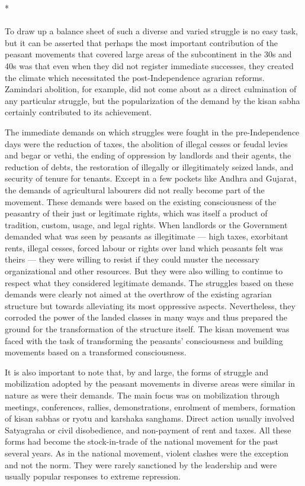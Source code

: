 \begin{center}*\end{center}

\paragraph*{}


To draw up a balance sheet of such a diverse and varied struggle is no easy task, but it can be asserted that perhaps the most important contribution of the peasant movements that covered large areas of the subcontinent in the 30s and 40s was that even when they did not register immediate successes, they created the climate which necessitated the post-Independence agrarian reforms. Zamindari abolition, for example, did not come about as a direct culmination of any particular struggle, but the popularization of the demand by the kisan sabha certainly contributed to its achievement.

The immediate demands on which struggles were fought in the pre-Independence days were the reduction of taxes, the abolition of illegal cesses or feudal levies and begar or vethi, the ending of oppression by landlords and their agents, the reduction of debts, the restoration of illegally or illegitimately seized lands, and security of tenure for tenants. Except in a few pockets like Andhra and Gujarat, the demands of agricultural labourers did not really become part of the movement. These demands were based on the existing consciousness of the peasantry of their just or legitimate rights, which was itself a product of tradition, custom, usage, and legal rights. When landlords or the Government demanded what was seen by peasants as illegitimate — high taxes, exorbitant rents, illegal cesses, forced labour or rights over land which peasants felt was theirs — they were willing to resist if they could muster the necessary organizational and other resources. But they were also willing to continue to respect what they considered legitimate demands. The struggles based on these demands were clearly not aimed at the overthrow of the existing agrarian structure but towards alleviating its most oppressive aspects. Nevertheless, they corroded the power of the landed classes in many ways and thus prepared the ground for the transformation of the structure itself. The kisan movement was faced with the task of transforming the peasants' consciousness and building movements based on a transformed consciousness.

It is also important to note that, by and large, the forms of struggle and mobilization adopted by the peasant movements in diverse areas were similar in nature as were their demands. The main focus was on mobilization through meetings, conferences, rallies, demonstrations, enrolment of members, formation of kisan sabhas or ryotu and karshaka sanghams. Direct action usually involved Satyagraha or civil disobedience, and non-payment of rent and taxes. All these forms had become the stock-in-trade of the national movement for the past several years. As in the national movement, violent clashes were the exception and not the norm. They were rarely sanctioned by the leadership and were usually popular responses to extreme repression.

